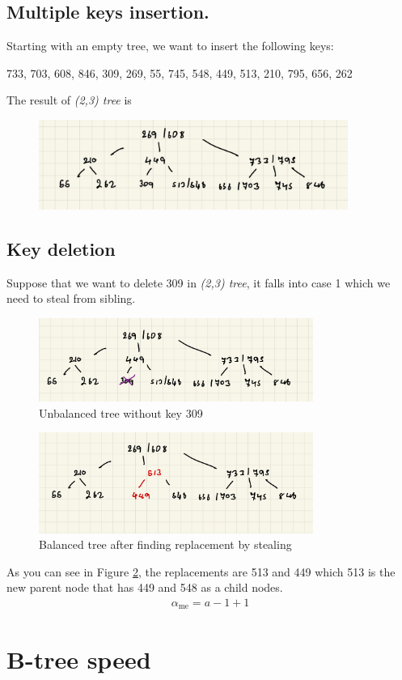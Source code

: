 \documentclass[a4paper, 12pt]{report}
\begin{document}
\section{Multiple keys insertion.}

Starting with an empty tree, we want to insert the following keys:
\begin{center}
        733, 703, 608, 846, 309, 269, 55, 745, 548, 449, 513, 210, 795, 656, 262
\end{center}

The result of \emph{(2,3) tree} is

\begin{figure}[h]
        \centering
        \includegraphics[width=0.9\textwidth,scale=0.5]{tree_insertion.jpeg}
\end{figure}

\section{Key deletion}

\noindent Suppose that we want to delete 309 in \emph{(2,3) tree}, it falls into case 1 which 
we need to steal from sibling.

\begin{figure}[h]
        \centering
        \includegraphics[width=0.8\textwidth,scale=0.5]{tree_deletion_1.jpeg}
        \caption{\label{fig:tree-deletion-1} Unbalanced tree without key 309}
\end{figure}

\begin{figure}[h]
        \centering
        \includegraphics[width=0.8\textwidth,scale=0.5]{tree_deletion_2.jpeg}
        \caption{\label{fig:tree-deletion-2} Balanced tree after finding replacement by stealing}
\end{figure}

As you can see in Figure \ref{fig:tree-deletion-2}, the replacements are 513 and 449 which 513 is the new parent node
that has 449 and 548 as a child nodes. 
\begin{align*}
        \alpha_{\text{me}} = a - 1 + 1
\end{align*} 


\chapter{B-tree speed}
\end{document}
